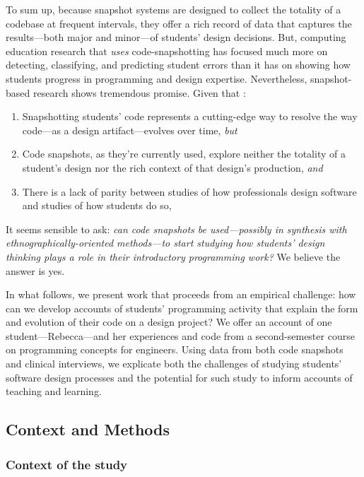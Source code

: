 To sum up, because snapshot systems are designed to collect the totality
of a codebase at frequent intervals, they offer a rich record of data
that captures the results---both major and minor---of students' design
decisions. But, computing education research that \emph{uses}
code-snapshotting has focused much more on detecting, classifying, and
predicting student errors than it has on showing how students progress
in programming and design expertise. Nevertheless, snapshot-based
research shows tremendous promise. Given that :

\begin{enumerate}
\def\labelenumi{\arabic{enumi}.}
\item
  Snapshotting students' code represents a cutting-edge way to resolve
  the way code---as a design artifact---evolves over time, \emph{but}
\item
  Code snapshots, as they're currently used, explore neither the
  totality of a student's design nor the rich context of that design's
  production, \emph{and}
\item
  There is a lack of parity between studies of how professionals design
  software and studies of how students do so,
\end{enumerate}

It seems sensible to ask: \emph{can code snapshots be used---possibly in
synthesis with ethnographically-oriented methods---to start studying how
students' design thinking plays a role in their introductory programming
work?} We believe the answer is yes.

In what follows, we present work that proceeds from an empirical
challenge: how can we develop accounts of students' programming activity
that explain the form and evolution of their code on a design project?
We offer an account of one student---Rebecca---and her experiences and
code from a second-semester course on programming concepts for
engineers. Using data from both code snapshots and clinical interviews,
we explicate both the challenges of studying students' software design
processes and the potential for such study to inform accounts of
teaching and learning.

\subsection{Context and Methods}\label{context-and-methods}

\subsubsection{Context of the study}\label{context-of-the-study}

